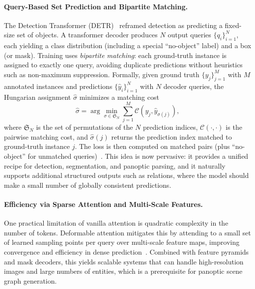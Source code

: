 \paragraph{Query-Based Set Prediction and Bipartite Matching.}
The Detection Transformer (DETR)~\citep{carion2020end} reframed detection as predicting a fixed-size set of objects. A transformer decoder produces $N$ output queries $\{q_i\}_{i=1}^{N}$, each yielding a class distribution (including a special ``no-object'' label) and a box (or mask). Training uses \emph{bipartite matching}: each ground-truth instance is assigned to exactly one query, avoiding duplicate predictions without heuristics such as non-maximum suppression. Formally, given ground truth $\{y_j\}_{j=1}^{M}$ with $M$ annotated instances and predictions $\{\hat y_i\}_{i=1}^{N}$ with $N$ decoder queries, the Hungarian assignment $\hat\sigma$ minimizes a matching cost
\begin{equation}
\hat\sigma=\arg\min_{\sigma\in\mathfrak{S}_N}\sum_{j=1}^{M}\mathcal{C}\!\left(y_j,\hat y_{\sigma(j)}\right),
\end{equation}
where $\mathfrak{S}_N$ is the set of permutations of the $N$ prediction indices, $\mathcal{C}(\cdot,\cdot)$ is the pairwise matching cost, and $\hat\sigma(j)$ returns the prediction index matched to ground-truth instance $j$. The loss is then computed on matched pairs (plus ``no-object'' for unmatched queries)~\citep{carion2020end}. This idea is now pervasive: it provides a unified recipe for detection, segmentation, and panoptic parsing, and it naturally supports additional structured outputs such as relations, where the model should make a small number of globally consistent predictions.

\paragraph{Efficiency via Sparse Attention and Multi-Scale Features.}
One practical limitation of vanilla attention is quadratic complexity in the number of tokens. Deformable attention mitigates this by attending to a small set of learned sampling points per query over multi-scale feature maps, improving convergence and efficiency in dense prediction~\citep{zhu2020deformable}. Combined with feature pyramids and mask decoders, this yields scalable systems that can handle high-resolution images and large numbers of entities, which is a prerequisite for panoptic scene graph generation.


